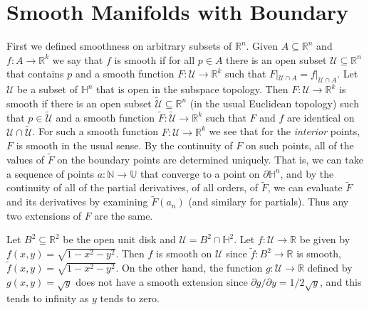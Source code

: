 \documentclass{article}                                                        %
\begin{document}
    \section{Smooth Manifolds with Boundary}
        First we defined smoothness on arbitrary subsets of $\mathbb{R}^{n}$.
        Given $A\subseteq\mathbb{R}^{n}$ and $f:A\rightarrow\mathbb{R}^{k}$ we
        say that $f$ is smooth if for all $p\in{A}$ there is an open subset
        $\mathcal{U}\subseteq\mathbb{R}^{n}$ that contains $p$ and a smooth
        function $F:\mathcal{U}\rightarrow\mathbb{R}^{k}$ such that
        $F|_{\mathcal{U}\cap{A}}=f|_{\mathcal{U}\cap{A}}$. Let $\mathcal{U}$ be
        a subset of $\mathbb{H}^{n}$ that is open in the subspace topology. Then
        $F:\mathcal{U}\rightarrow\mathbb{R}^{k}$ is smooth if there is an open
        subset $\tilde{\mathcal{U}}\subseteq\mathbb{R}^{n}$ (in the usual
        Euclidean topology) such that $p\in\tilde{\mathcal{U}}$ and a smooth
        function $\tilde{F}:\tilde{\mathcal{U}}\rightarrow\mathbb{R}^{k}$ such
        that $F$ and $f$ are identical on $\mathcal{U}\cap\tilde{\mathcal{U}}$.
        For such a smooth function $F:\mathcal{U}\rightarrow\mathbb{R}^{k}$ we
        see that for the \textit{interior} points, $F$ is smooth in the usual
        sense. By the continuity of $F$ on such points, all of the values of
        $\tilde{F}$ on the boundary points are determined uniquely. That is,
        we can take a sequence of points $a:\mathbb{N}\rightarrow\mathbb{U}$
        that converge to a point on $\partial\mathbb{H}^{n}$, and by the
        continuity of all of the partial derivatives, of all orders, of
        $\tilde{F}$, we can evaluate $\tilde{F}$ and its derivatives by
        examining $\tilde{F}(a_{n})$ (and similary for partials). Thus any two
        extensions of $F$ are the same.
        \begin{example}
            Let $B^{2}\subseteq\mathbb{R}^{2}$ be the open unit disk and
            $\mathcal{U}=B^{2}\cap\mathbb{H}^{2}$. Let
            $f:\mathcal{U}\rightarrow\mathbb{R}$ be given by
            $f(x,y)=\sqrt{1-x^{2}-y^{2}}$. Then $f$ is smooth on $\mathcal{U}$
            since $\tilde{f}:B^{2}\rightarrow\mathbb{R}$ is smooth,
            $\tilde{f}(x,y)=\sqrt{1-x^{2}-y^{2}}$. On the other hand, the
            function $g:\mathcal{U}\rightarrow\mathbb{R}$ defined by
            $g(x,y)=\sqrt{y}$ does not have a smooth extension since
            $\partial{g}/\partial{y}=1/2\sqrt{y}$, and this tends to infinity as
            $y$ tends to zero.
        \end{example}
\end{document}
